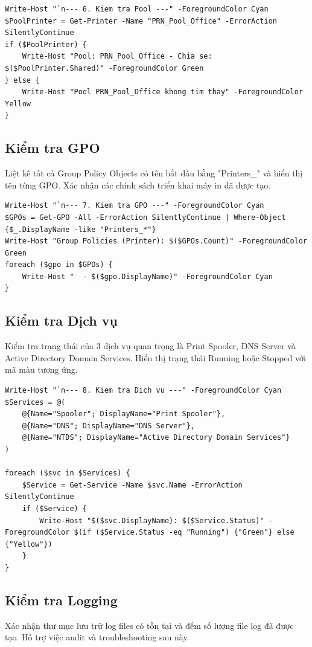 \begin{lstlisting}[style=powershell]
Write-Host "`n--- 6. Kiem tra Pool ---" -ForegroundColor Cyan
$PoolPrinter = Get-Printer -Name "PRN_Pool_Office" -ErrorAction SilentlyContinue
if ($PoolPrinter) {
    Write-Host "Pool: PRN_Pool_Office - Chia se: $($PoolPrinter.Shared)" -ForegroundColor Green
} else {
    Write-Host "Pool PRN_Pool_Office khong tim thay" -ForegroundColor Yellow
}
\end{lstlisting}

\subsection{Kiểm tra GPO}
Liệt kê tất cả Group Policy Objects có tên bắt đầu bằng "Printers\_" và hiển thị tên từng GPO. Xác nhận các chính sách triển khai máy in đã được tạo.

\begin{lstlisting}[style=powershell]
Write-Host "`n--- 7. Kiem tra GPO ---" -ForegroundColor Cyan
$GPOs = Get-GPO -All -ErrorAction SilentlyContinue | Where-Object {$_.DisplayName -like "Printers_*"}
Write-Host "Group Policies (Printer): $($GPOs.Count)" -ForegroundColor Green
foreach ($gpo in $GPOs) {
    Write-Host "  - $($gpo.DisplayName)" -ForegroundColor Cyan
}
\end{lstlisting}

\subsection{Kiểm tra Dịch vụ}
Kiểm tra trạng thái của 3 dịch vụ quan trọng là Print Spooler, DNS Server và Active Directory Domain Services. Hiển thị trạng thái Running hoặc Stopped với mã màu tương ứng.

\begin{lstlisting}[style=powershell]
Write-Host "`n--- 8. Kiem tra Dich vu ---" -ForegroundColor Cyan
$Services = @(
    @{Name="Spooler"; DisplayName="Print Spooler"},
    @{Name="DNS"; DisplayName="DNS Server"},
    @{Name="NTDS"; DisplayName="Active Directory Domain Services"}
)

foreach ($svc in $Services) {
    $Service = Get-Service -Name $svc.Name -ErrorAction SilentlyContinue
    if ($Service) {
        Write-Host "$($svc.DisplayName): $($Service.Status)" -ForegroundColor $(if ($Service.Status -eq "Running") {"Green"} else {"Yellow"})
    }
}
\end{lstlisting}

\subsection{Kiểm tra Logging}
Xác nhận thư mục lưu trữ log files có tồn tại và đếm số lượng file log đã được tạo. Hỗ trợ việc audit và troubleshooting sau này.


